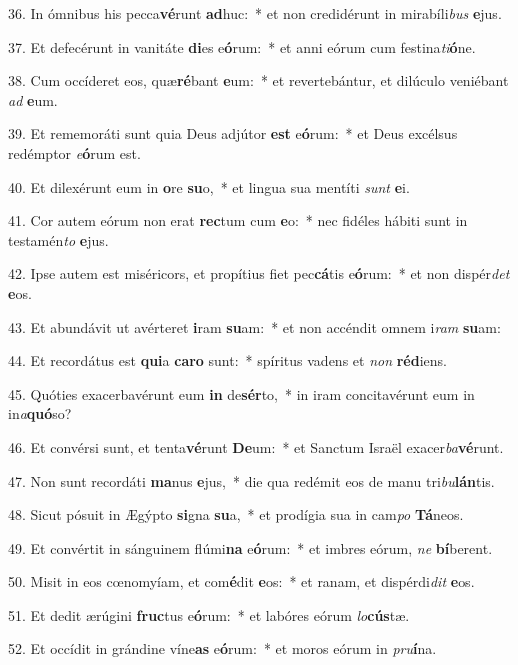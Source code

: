 36. In ómnibus his pecca\textbf{vé}runt \textbf{ad}huc:~*  et non credidérunt in mirabíli\textit{bus} \textbf{e}jus.\

37. Et defecérunt in vanitáte \textbf{di}es e\textbf{ó}rum:~*  et anni eórum cum festina\textit{ti}\textbf{ó}ne.\

38. Cum occíderet eos, quæ\textbf{ré}bant \textbf{e}um:~*  et revertebántur, et dilúculo veniébant \textit{ad} \textbf{e}um.\

39. Et rememoráti sunt quia Deus adjútor \textbf{est} e\textbf{ó}rum:~*  et Deus excélsus redémptor \textit{e}\textbf{ó}rum est.\

40. Et dilexérunt eum in \textbf{o}re \textbf{su}o,~*  et lingua sua mentíti \textit{sunt} \textbf{e}i.\

41. Cor autem eórum non erat \textbf{rec}tum cum \textbf{e}o:~*  nec fidéles hábiti sunt in testamén\textit{to} \textbf{e}jus.\

42. Ipse autem est miséricors, et propítius fiet pec\textbf{cá}tis e\textbf{ó}rum:~*  et non dispér\textit{det} \textbf{e}os.\

43. Et abundávit ut avérteret \textbf{i}ram \textbf{su}am:~*  et non accéndit omnem i\textit{ram} \textbf{su}am:\

44. Et recordátus est \textbf{qui}a \textbf{ca}\textbf{ro} sunt:~*  spíritus vadens et \textit{non} \textbf{réd}iens.\

45. Quóties exacerbavérunt eum \textbf{in} de\textbf{sér}to,~*  in iram concitavérunt eum in in\textit{a}\textbf{quó}so?\

46. Et convérsi sunt, et tenta\textbf{vé}runt \textbf{De}um:~*  et Sanctum Israël exacer\textit{ba}\textbf{vé}runt.\

47. Non sunt recordáti \textbf{ma}nus \textbf{e}jus,~*  die qua redémit eos de manu tri\textit{bu}\textbf{lán}tis.\

48. Sicut pósuit in Ægýpto \textbf{si}gna \textbf{su}a,~*  et prodígia sua in cam\textit{po} \textbf{Tá}neos.\

49. Et convértit in sánguinem flúmi\textbf{na} e\textbf{ó}rum:~*  et imbres eórum, \textit{ne} \textbf{bí}berent.\

50. Misit in eos cœnomyíam, et com\textbf{é}dit \textbf{e}os:~*  et ranam, et dispérdi\textit{dit} \textbf{e}os.\

51. Et dedit ærúgini \textbf{fruc}tus e\textbf{ó}rum:~*  et labóres eórum \textit{lo}\textbf{cús}tæ.\

52. Et occídit in grándine víne\textbf{as} e\textbf{ó}rum:~*  et moros eórum in \textit{pru}\textbf{í}na.\

